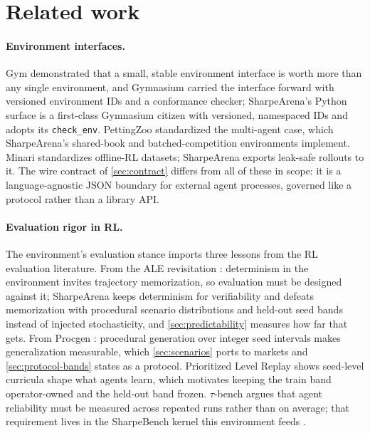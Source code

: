 \section{Related work}\label{sec:related}

\paragraph{Environment interfaces.} Gym \citep{brockman2016gym} demonstrated that a small, stable environment interface is worth more than any single environment, and Gymnasium \citep{towers2024gymnasium} carried the interface forward with versioned environment IDs and a conformance checker; SharpeArena's Python surface is a first-class Gymnasium citizen with versioned, namespaced IDs and adopts its \texttt{check\_env}. PettingZoo \citep{terry2021pettingzoo} standardized the multi-agent case, which SharpeArena's shared-book and batched-competition environments implement. Minari \citep{minari} standardizes offline-RL datasets; SharpeArena exports leak-safe rollouts to it. The wire contract of \cref{sec:contract} differs from all of these in scope: it is a language-agnostic JSON boundary for external agent processes, governed like a protocol rather than a library API.

\paragraph{Evaluation rigor in RL.} The environment's evaluation stance imports three lessons from the RL evaluation literature. From the ALE revisitation \citep{machado2018revisiting}: determinism in the environment invites trajectory memorization, so evaluation must be designed against it; SharpeArena keeps determinism for verifiability and defeats memorization with procedural scenario distributions and held-out seed bands instead of injected stochasticity, and \cref{sec:predictability} measures how far that gets. From Procgen \citep{cobbe2020procgen}: procedural generation over integer seed intervals makes generalization measurable, which \cref{sec:scenarios} ports to markets and \cref{sec:protocol-bands} states as a protocol. Prioritized Level Replay \citep{jiang2021prioritized} shows seed-level curricula shape what agents learn, which motivates keeping the train band operator-owned and the held-out band frozen. $\tau$-bench \citep{yao2024taubench} argues that agent reliability must be measured across repeated runs rather than on average; that requirement lives in the SharpeBench kernel this environment feeds \citep{toca2026sharpebench}.

